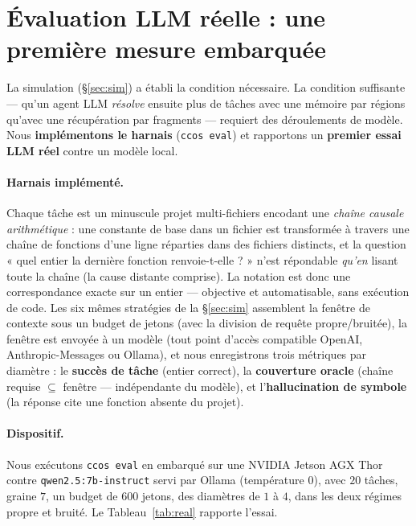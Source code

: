 \documentclass[11pt]{article}
\newcommand{\code}[1]{\texttt{#1}}
\begin{document}
\section{Évaluation LLM réelle : une première mesure embarquée}\label{sec:protocol}

La simulation (\S\ref{sec:sim}) a établi la condition nécessaire. La condition
suffisante --- qu'un agent LLM \emph{résolve} ensuite plus de tâches avec une mémoire
par régions qu'avec une récupération par fragments --- requiert des déroulements de
modèle. Nous \textbf{implémentons le harnais} (\code{ccos eval}) et rapportons un
\textbf{premier essai LLM réel} contre un modèle local.

\paragraph{Harnais implémenté.} Chaque tâche est un minuscule projet multi-fichiers
encodant une \emph{chaîne causale arithmétique} : une constante de base dans un fichier
est transformée à travers une chaîne de fonctions d'une ligne réparties dans des
fichiers distincts, et la question « quel entier la dernière fonction renvoie-t-elle ? »
n'est répondable \emph{qu'en} lisant toute la chaîne (la cause distante comprise). La
notation est donc une correspondance exacte sur un entier --- objective et
automatisable, sans exécution de code. Les six mêmes stratégies de la \S\ref{sec:sim}
assemblent la fenêtre de contexte sous un budget de jetons (avec la division de requête
propre/bruitée), la fenêtre est envoyée à un modèle (tout point d'accès compatible
OpenAI, Anthropic-Messages ou Ollama), et nous enregistrons trois métriques par
diamètre : le \textbf{succès de tâche} (entier correct), la \textbf{couverture oracle}
(chaîne requise $\subseteq$ fenêtre --- indépendante du modèle), et
l'\textbf{hallucination de symbole} (la réponse cite une fonction absente du projet).

\paragraph{Dispositif.} Nous exécutons \code{ccos eval} en embarqué sur une NVIDIA
Jetson AGX Thor contre \code{qwen2.5:7b-instruct} servi par Ollama (température $0$),
avec $20$ tâches, graine $7$, un budget de $600$ jetons, des diamètres de $1$ à $4$,
dans les deux régimes propre et bruité. Le Tableau~\ref{tab:real} rapporte l'essai.
\end{document}
